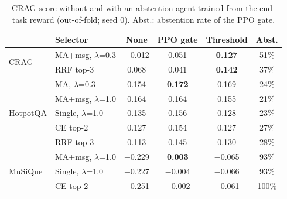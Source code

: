 \documentclass[sigconf,anonymous]{aamas}
\theoremstyle{plain}
\theoremstyle{definition}
\begin{document}
\begin{table}[t]
\centering\small
\caption{CRAG score without and with an abstention agent trained from the end-task reward (out-of-fold; seed 0). Abst.: abstention rate of the PPO gate.}
\label{tab:gate}
\setlength{\tabcolsep}{3pt}
\begin{tabular}{ll c cc c}
\toprule
 & Selector & None & PPO gate & Threshold & Abst. \\
\midrule
\multirow{2}{*}{CRAG}
 & MA+msg, $\lambda$=0.3 & $-$0.012 & 0.051 & \textbf{0.127} & 51\% \\
 & RRF top-3 & 0.068 & 0.041 & \textbf{0.142} & 37\% \\
\midrule
\multirow{5}{*}{HotpotQA}
 & MA, $\lambda$=0.3 & 0.154 & \textbf{0.172} & 0.169 & 24\% \\
 & MA+msg, $\lambda$=1.0 & 0.164 & 0.164 & 0.155 & 21\% \\
 & Single, $\lambda$=1.0 & 0.135 & 0.156 & 0.128 & 23\% \\
 & CE top-2 & 0.127 & 0.154 & 0.127 & 27\% \\
 & RRF top-3 & 0.113 & 0.145 & 0.130 & 28\% \\
\midrule
\multirow{3}{*}{MuSiQue}
 & MA+msg, $\lambda$=1.0 & $-$0.229 & \textbf{0.003} & $-$0.065 & 93\% \\
 & Single, $\lambda$=1.0 & $-$0.227 & $-$0.004 & $-$0.066 & 93\% \\
 & CE top-2 & $-$0.251 & $-$0.002 & $-$0.061 & 100\% \\
\bottomrule
\end{tabular}
\end{table}
\end{document}
